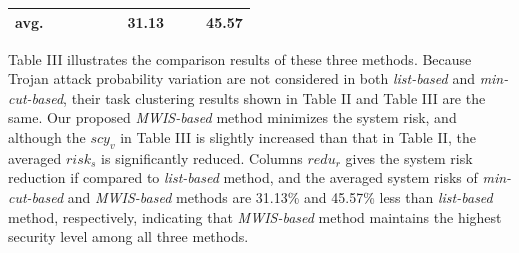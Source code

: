 \documentclass[10pt,journal]{IEEEtran}
\begin{document}
\begin{table}[!h]
\begin{tabular}{c|c|c|c|c|c|c|c|c|c}
\hline

avg.               &  &   &   &  &  &\hspace*{-0.8em}31.13\hspace*{-0.8em}  &   &  &\hspace*{-0.8em}45.57\hspace*{-0.8em}  \\
\hline
\hline
\end{tabular}
\label{table:VPCTC}
\end{table}

Table III illustrates the comparison results of these three methods. Because Trojan attack probability variation are not considered in both \textit{list-based} and \textit{min-cut-based}, their task clustering results shown in Table II and Table III are the same. Our proposed \textit{MWIS-based} method minimizes the system risk, and although the $scy_v$ in Table III is slightly increased than that in Table II, the averaged $risk_s$ is significantly reduced. Columns $redu_r$ gives the system risk reduction if compared to \textit{list-based} method, and the averaged system risks of \textit{min-cut-based} and \textit{MWIS-based} methods are 31.13\% and 45.57\% less than \textit{list-based} method, respectively, indicating that \textit{MWIS-based} method maintains the highest security level among all three methods.
\end{document}
